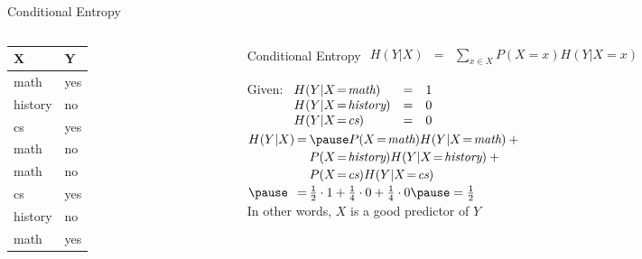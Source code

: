 \documentclass[14pt]{beamer}
\begin{document}
\begin{frame}{Conditional Entropy}
\begin{columns}
\begin{column}{1.1in}
\begin{tabular}{ll}
X               & Y   \\
\hline
math            & yes \\
history         & no  \\
cs              & yes \\
math            & no  \\
math            & no  \\
cs              & yes \\
history         & no  \\
math            & yes \\
\end{tabular}
\end{column}
\begin{column}{3.1in}
\begin{block}{Conditional Entropy}
$
\begin{array}{lll}
H(Y|X) & = & \sum\limits_{x \in X}P(X\!=\!x)H(Y|X\!=\!x)
\end{array}
$
\end{block}
\pause
\small
Given:
$
\begin{array}[t]{lll}
H(Y|X\!=\!\textit{math})    & = & 1 \\
H(Y|X\!=\!\textit{history}) & = & 0 \\
H(Y|X\!=\!\textit{cs})      & = & 0 \\
\end{array}
$ \\
\smallskip
\pause
$
\extrarowheight=2pt
\begin{array}{@{}l@{\hspace{2pt}}l@{\hspace{2pt}}l@{}}
H(Y|X) & = & \pause P(X\!=\!\textit{math}) H(Y|X\!=\!\textit{math}) + \mbox{}\\
       &   & P(X\!=\!\textit{history}) H(Y|X\!=\!\textit{history}) + \mbox{}\\
       &   & P(X\!=\!\textit{cs}) H(Y|X\!=\!\textit{cs}) \\
\pause & = & \frac{1}{2} \cdot 1 + \frac{1}{4} \cdot 0 + \frac{1}{4} \cdot 0 \pause = \frac{1}{2}
\end{array}
$ \\
\medskip
\pause
In other words, $X$ is a good predictor of $Y$
\end{column}
\end{columns}
\end{frame}
\end{document}
